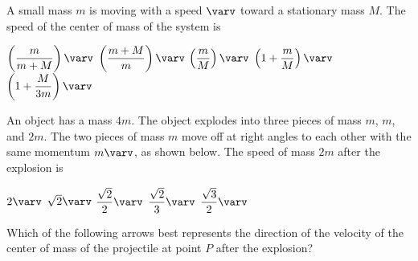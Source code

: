 \documentclass{../../oss-apphys-exam}
\begin{document}
\begin{multicols*}{2}
\begin{questions}
    \question A small mass $m$ is moving with a speed $\varv$ toward a
    stationary mass $M$. The speed of the center of mass of the system is
    \begin{choices}
      \choice $\left(\dfrac m{m+M}\right)\varv$
      \choice $\left(\dfrac{m+M} m\right)\varv$
      \choice $\left(\dfrac mM\right)\varv$
      \choice $\left(1+\dfrac mM\right)\varv$
      \choice $\left(1+\dfrac M{3m}\right)\varv$
    \end{choices}

    \question An object has a mass $4m$. The object explodes into three pieces
    of mass $m$, $m$, and $2m$. The two pieces of mass $m$ move off at right
    angles to each other with the same momentum $m\varv$, as shown below. The
    speed of mass $2m$ after the explosion is
    \begin{center}
    \end{center}
    \vspace{-.2in}
    \begin{choices}
      \choice $2\varv$
      \choice $\sqrt 2\varv$
      \choice $\dfrac{\sqrt 2}2\varv$
      \choice $\dfrac{\sqrt 2}3\varv$
      \choice $\dfrac{\sqrt 3}2\varv$
    \end{choices}


    \question Which of the following arrows best represents the direction of the
    velocity of the center of mass of the projectile at point $P$ after the
    explosion?
    \label{cm1}
    \begin{choices}
      \choice{\huge$\leftarrow$}
      \choice{\huge$\swarrow$}
      \choice{\huge$\searrow$}
      \choice{\huge$\rightarrow$}
      \choice{\huge$\nearrow$}
    \end{choices}
    

\end{questions}
\end{multicols*}
\end{document}

